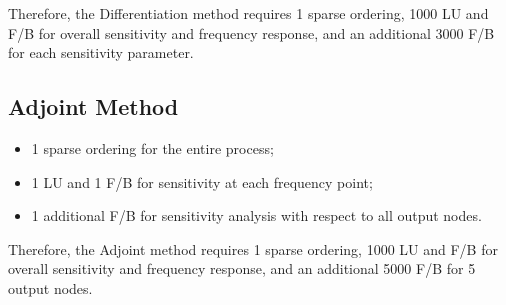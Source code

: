 \documentclass[a4paper,titlepage, 12pt]{article}
\begin{document}
			Therefore, the Differentiation method requires 1 sparse ordering, 1000 LU and F/B for overall sensitivity and frequency response, and an additional 3000 F/B for each sensitivity parameter. 
			
		\subsection{Adjoint Method}
			\begin{itemize}
				\item 1 sparse ordering for the entire process;
				\item 1 LU and 1 F/B for sensitivity at each frequency point;
				\item 1 additional F/B for sensitivity analysis with respect to all output nodes. 
			\end{itemize}
			
			Therefore, the Adjoint method requires 1 sparse ordering, 1000 LU and F/B for overall sensitivity and frequency response, and an additional 5000 F/B for 5 output nodes. 
\end{document}
